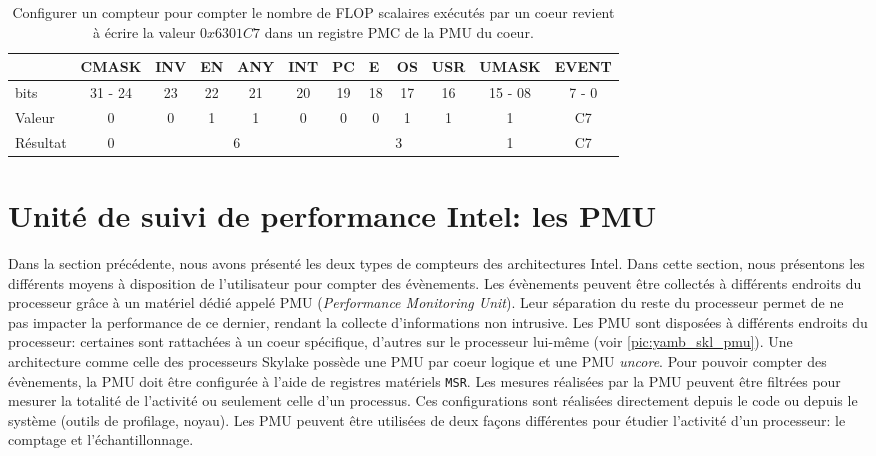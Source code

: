             \begin{table}
            \centering
            \begin{tabular}{l|c|c|c|c|c|c|c|c|c|c|c|}
            \cline{2-12}
            & \multicolumn{1}{l|}{CMASK} & \multicolumn{1}{l|}{INV} & \multicolumn{1}{l|}{EN} & \multicolumn{1}{l|}{ANY} & \multicolumn{1}{l|}{INT} & \multicolumn{1}{l|}{PC} & \multicolumn{1}{l|}{E} & \multicolumn{1}{l|}{OS} & \multicolumn{1}{l|}{USR} & \multicolumn{1}{l|}{UMASK} & \multicolumn{1}{l|}{EVENT} \\ \hline
            \multicolumn{1}{|l|}{bits} & 31 - 24 & 23 & 22 & 21 & 20 & 19 & 18 & 17 & 16 & 15 - 08 & 7 - 0 \\ \hline
            \multicolumn{1}{|l|}{Valeur} & 0 & 0 & 1 & 1 & 0 & 0 & 0 & 1 & 1 & 1 & C7 \\ \hline
            \multicolumn{1}{|l|}{Résultat} & 0 & \multicolumn{4}{c|}{6} & \multicolumn{4}{c|}{3} & 1 & C7 \\ \hline
            \end{tabular}%
            \caption{Configurer un compteur pour compter le nombre de \gls{FLOP} scalaires exécutés par un coeur revient à écrire la valeur $0x6301C7$ dans un registre PMC de la PMU du coeur.}
            \label{tab:pmc_config}
            \end{table}


\section{ Unité de suivi de performance Intel: les PMU}\label{sec:pmu}
    Dans la section précédente, nous avons présenté les deux types de compteurs des architectures Intel. Dans cette section, nous présentons les différents moyens à disposition de l'utilisateur pour compter des évènements. Les évènements peuvent être collectés à différents endroits du processeur grâce à un matériel dédié appelé PMU (\textit{Performance Monitoring Unit}). Leur séparation du reste du processeur permet de ne pas impacter la performance de ce dernier, rendant la collecte d'informations non intrusive. Les PMU sont disposées à différents endroits du processeur: certaines sont rattachées à un coeur spécifique, d'autres sur le processeur lui-même (voir \autoref{pic:yamb_skl_pmu}).  Une architecture comme celle des processeurs Skylake possède une PMU par coeur logique et une PMU \textit{uncore}. Pour pouvoir compter des évènements, la PMU doit être configurée à l'aide de registres matériels \verb|MSR|. Les mesures réalisées par la PMU peuvent être filtrées pour mesurer la totalité de l'activité ou seulement celle d'un processus. Ces configurations sont réalisées  directement depuis le code ou depuis le système (outils de profilage, noyau). Les PMU peuvent être utilisées de deux façons différentes pour étudier l'activité d'un processeur: le comptage et l'échantillonnage. 
        
